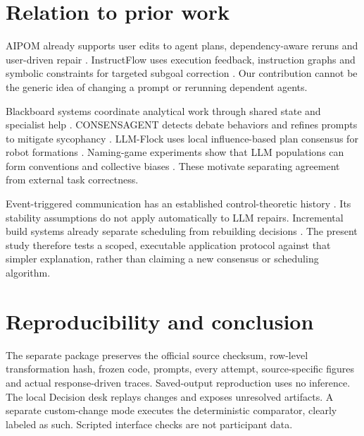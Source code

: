 \documentclass[10pt]{article}
\begin{document}
\section{Relation to prior work}
AIPOM already supports user edits to agent plans, dependency-aware reruns and user-driven repair \citep{kim2025aipom}. InstructFlow uses execution feedback, instruction graphs and symbolic constraints for targeted subgoal correction \citep{chi2025instructflow}. Our contribution cannot be the generic idea of changing a prompt or rerunning dependent agents.

Blackboard systems coordinate analytical work through shared state and specialist help \citep{salemi2026blackboard}. CONSENSAGENT detects debate behaviors and refines prompts to mitigate sycophancy \citep{pitre2025consensagent}. LLM-Flock uses local influence-based plan consensus for robot formations \citep{li2025flock}. Naming-game experiments show that LLM populations can form conventions and collective biases \citep{ashery2025conventions}. These motivate separating agreement from external task correctness.

Event-triggered communication has an established control-theoretic history \citep{nowzari2019event}. Its stability assumptions do not apply automatically to LLM repairs. Incremental build systems already separate scheduling from rebuilding decisions \citep{mokhov2018build}. The present study therefore tests a scoped, executable application protocol against that simpler explanation, rather than claiming a new consensus or scheduling algorithm.

\section{Reproducibility and conclusion}
The separate package preserves the official source checksum, row-level transformation hash, frozen code, prompts, every attempt, source-specific figures and actual response-driven traces. Saved-output reproduction uses no inference. The local Decision desk replays changes and exposes unresolved artifacts. A separate custom-change mode executes the deterministic comparator, clearly labeled as such. Scripted interface checks are not participant data.


\begingroup\small


\endgroup
\clearpage
\appendix
\end{document}
